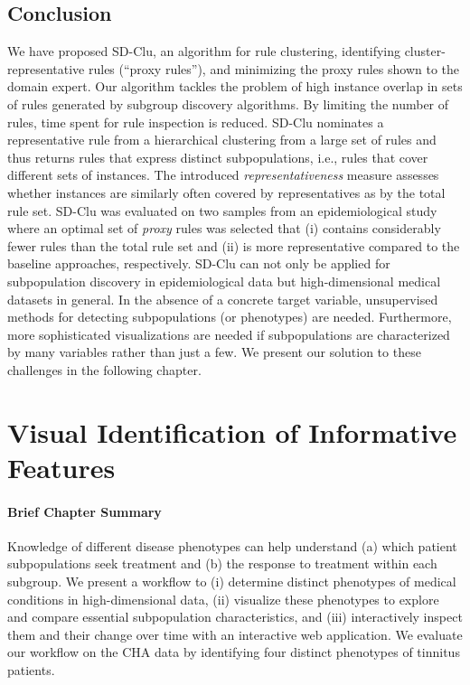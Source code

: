 \documentclass[
  oneside]{book}
\newenvironment{infobox}[1]
  {
  \begin{chapter-summary}
  }
  {
  \end{chapter-summary}
  }
\begin{document}
\hypertarget{sdclu-conclusion}{%
\section{Conclusion}\label{sdclu-conclusion}}

We have proposed SD-Clu, an algorithm for rule clustering, identifying cluster-representative rules (``proxy rules''), and minimizing the proxy rules shown to the domain expert.
Our algorithm tackles the problem of high instance overlap in sets of rules generated by subgroup discovery algorithms.
By limiting the number of rules, time spent for rule inspection is reduced.
SD-Clu nominates a representative rule from a hierarchical clustering from a large set of rules and thus returns rules that express distinct subpopulations, i.e., rules that cover different sets of instances.
The introduced \emph{representativeness} measure assesses whether instances are similarly often covered by representatives as by the total rule set.
SD-Clu was evaluated on two samples from an epidemiological study where an optimal set of \emph{proxy} rules was selected that (i) contains considerably fewer rules than the total rule set and (ii) is more representative compared to the baseline approaches, respectively.
SD-Clu can not only be applied for subpopulation discovery in epidemiological data but high-dimensional medical datasets in general.
In the absence of a concrete target variable, unsupervised methods for detecting subpopulations (or phenotypes) are needed.
Furthermore, more sophisticated visualizations are needed if subpopulations are characterized by many variables rather than just a few.
We present our solution to these challenges in the following chapter.

\hypertarget{phenotypes}{%
\chapter{Visual Identification of Informative Features}\label{phenotypes}}

\begin{infobox}{tasks.pdf}

\hypertarget{brief-chapter-summary-2}{%
\subsubsection*{Brief Chapter Summary}\label{brief-chapter-summary-2}}

Knowledge of different disease phenotypes can help understand (a) which patient subpopulations seek treatment and (b) the response to treatment within each subgroup.
We present a workflow to (i) determine distinct phenotypes of medical conditions in high-dimensional data, (ii) visualize these phenotypes to explore and compare essential subpopulation characteristics, and (iii) interactively inspect them and their change over time with an interactive web application.
We evaluate our workflow on the CHA data by identifying four distinct phenotypes of tinnitus patients.

\end{infobox}
\end{document}
